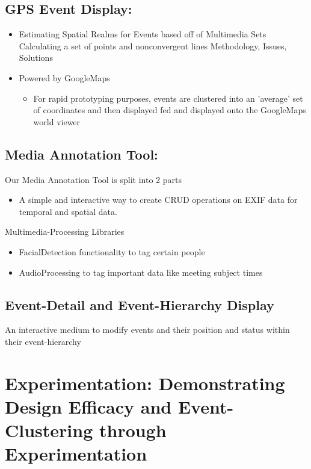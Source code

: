 \documentclass[11pt]{article}
\begin{document}
\subsection{GPS Event Display:}
\label{sec:orgbb30b01}
\begin{itemize}
\item Estimating Spatial Realms for Events based off of Multimedia Sets
Calculating a set of points and nonconvergent lines
    Methodology, Issues, Solutions
\end{itemize}


\begin{itemize}
\item Powered by GoogleMaps
\begin{itemize}
\item For rapid prototyping purposes, events are clustered into an 'average' set of coordinates and then displayed fed and displayed onto the GoogleMaps world viewer
\end{itemize}
\end{itemize}

\subsection{Media Annotation Tool:}
\label{sec:orgeab4932}
Our Media Annotation Tool is split into 2 parts
\begin{itemize}
\item A simple and interactive way to create CRUD operations on EXIF data for temporal and spatial data.
\end{itemize}
Multimedia-Processing Libraries
\begin{itemize}
\item FacialDetection functionality to tag certain people
\item AudioProcessing to tag important data like meeting subject times
\end{itemize}

\subsection{Event-Detail and Event-Hierarchy Display}
\label{sec:orgcc763d2}
An interactive medium to modify events and their position and status within their event-hierarchy


\newpage
\section{Experimentation: Demonstrating Design Efficacy and Event-Clustering through Experimentation}
\label{sec:org028c8c7}
\end{document}
